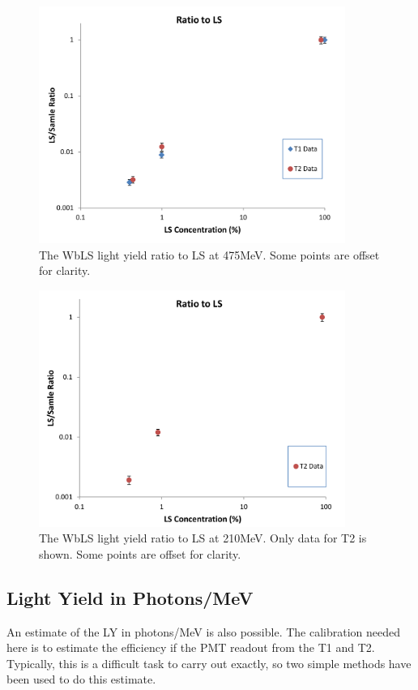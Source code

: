 \documentclass[preprint,12pt]{elsarticle}
\begin{document}
\begin{figure}[ht]
	\centering
		\includegraphics[width=100mm]{475MEV_RatioToLS.pdf}
	\caption{The WbLS light yield ratio to LS at 475MeV. Some points are offset for clarity.}
	\label{fig:475MEV_RatioToLS}
\end{figure}

\begin{figure}[ht]
	\centering
		\includegraphics[width=100mm]{210MEV_RatioToLS.pdf}
	\caption{The WbLS light yield ratio to LS at 210MeV. Only data for T2 is shown. Some points are offset for clarity.}
	\label{fig:210MEV_RatioToLS}
\end{figure}

\subsection{Light Yield in Photons/MeV}

An estimate of the LY in photons/MeV is also possible. The calibration needed here is to estimate the efficiency if the PMT readout from the T1 and T2. Typically, this is a difficult task to carry out exactly, so two simple methods have been used to do this estimate.
\end{document}
